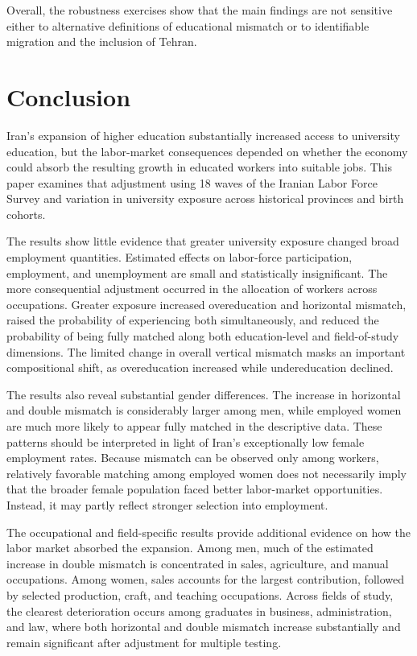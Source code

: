 Overall, the robustness exercises show that the main findings are not sensitive either to alternative definitions of educational mismatch or to identifiable migration and the inclusion of Tehran.

\section{Conclusion}
\label{sec:conclusion}

Iran's expansion of higher education substantially increased access to university education, but the labor-market consequences depended on whether the economy could absorb the resulting growth in educated workers into suitable jobs. This paper examines that adjustment using 18 waves of the Iranian Labor Force Survey and variation in university exposure across historical provinces and birth cohorts.

The results show little evidence that greater university exposure changed broad employment quantities. Estimated effects on labor-force participation, employment, and unemployment are small and statistically insignificant. The more consequential adjustment occurred in the allocation of workers across occupations. Greater exposure increased overeducation and horizontal mismatch, raised the probability of experiencing both simultaneously, and reduced the probability of being fully matched along both education-level and field-of-study dimensions. The limited change in overall vertical mismatch masks an important compositional shift, as overeducation increased while undereducation declined.

The results also reveal substantial gender differences. The increase in horizontal and double mismatch is considerably larger among men, while employed women are much more likely to appear fully matched in the descriptive data. These patterns should be interpreted in light of Iran's exceptionally low female employment rates. Because mismatch can be observed only among workers, relatively favorable matching among employed women does not necessarily imply that the broader female population faced better labor-market opportunities. Instead, it may partly reflect stronger selection into employment.

The occupational and field-specific results provide additional evidence on how the labor market absorbed the expansion. Among men, much of the estimated increase in double mismatch is concentrated in sales, agriculture, and manual occupations. Among women, sales accounts for the largest contribution, followed by selected production, craft, and teaching occupations. Across fields of study, the clearest deterioration occurs among graduates in business, administration, and law, where both horizontal and double mismatch increase substantially and remain significant after adjustment for multiple testing.

